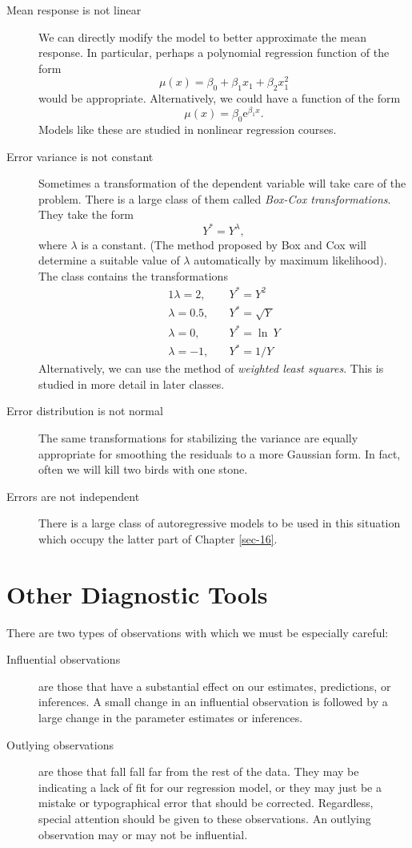 \documentclass[captions=tableheading]{scrbook}
\begin{document}
\begin{description}
\item[Mean response is not linear] We can directly modify the model to better approximate the mean response. In particular, perhaps a polynomial regression function of the form 
  \[
  \mu(x) = \beta_{0} + \beta_{1}x_{1} + \beta_{2}x_{1}^{2}
  \]
  would be appropriate. Alternatively, we could have a function of the form
  \[
  \mu(x)=\beta_{0}\mathrm{e}^{\beta_{1}x}.
  \]
  Models like these are studied in nonlinear regression courses.
\item[Error variance is not constant] Sometimes a transformation of the dependent variable will take care of the problem. There is a large class of them called \emph{Box-Cox transformations}. They take the form 
  \begin{equation}
  Y^{\ast}=Y^{\lambda},
  \end{equation}
  where \(\lambda\) is a constant. (The method proposed by Box and Cox will determine a suitable value of \(\lambda\) automatically by maximum likelihood). The class contains the transformations 
  \begin{alignat*}{1}
  \lambda=2,\quad & Y^{\ast}=Y^{2}\\
  \lambda=0.5,\quad & Y^{\ast}=\sqrt{Y}\\
  \lambda=0,\quad & Y^{\ast}=\ln\: Y\\
  \lambda=-1,\quad & Y^{\ast}=1/Y
  \end{alignat*}
  Alternatively, we can use the method of \emph{weighted least squares}. This is studied in more detail in later classes.
\item[Error distribution is not normal] The same transformations for stabilizing the variance are equally appropriate for smoothing the residuals to a more Gaussian form. In fact, often we will kill two birds with one stone.
\item[Errors are not independent] There is a large class of autoregressive models to be used in this situation which occupy the latter part of Chapter \ref{sec-16}.
\end{description}
\section{Other Diagnostic Tools}
\label{sec-11-5}
\label{sec-Other-Diagnostic-Tools-SLR}


There are two types of observations with which we must be especially careful:
\begin{description}
\item[Influential observations] are those that have a substantial effect on our estimates, predictions, or inferences. A small change in an influential observation is followed by a large change in the parameter estimates or inferences.
\item[Outlying observations] are those that fall fall far from the rest of the data. They may be indicating a lack of fit for our regression model, or they may just be a mistake or typographical error that should be corrected. Regardless, special attention should be given to these observations. An outlying observation may or may not be influential.
\end{description}
\end{document}
